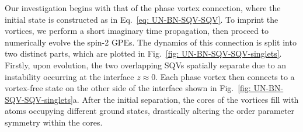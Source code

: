 Our investigation begins with that of the phase vortex connection, where the
initial state is constructed as in Eq.~\eqref{eq: UN-BN-SQV-SQV}.
To imprint the vortices, we perform a short imaginary time propagation, then
proceed to numerically evolve the spin-2 GPEs.
The dynamics of this connection is split into two distinct parts, which are
plotted in Fig.~\ref{fig: UN-BN-SQV-SQV-singlets}.
Firstly, upon evolution, the two overlapping SQVs spatially separate due to an
instability occurring at the interface \(z \approx 0\).
Each phase vortex then connects to a vortex-free state on the other side of the
interface shown in Fig.~\ref{fig: UN-BN-SQV-SQV-singlets}a.
After the initial separation, the cores of the vortices fill with atoms
occupying different ground states, drastically altering the order parameter
symmetry within the cores.
\begin{figure}
    \centering
\end{figure}
